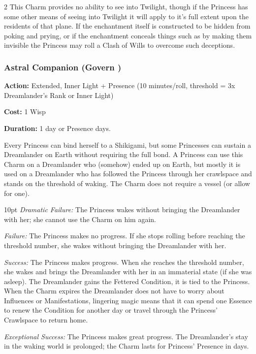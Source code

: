 \begin{multicols}{2}
This Charm provides no ability to see into Twilight, though if the Princess has some other means of seeing into Twilight it will apply to it's full extent upon the residents of that plane. If the enchantment itself is constructed to be hidden from poking and prying, or if the enchantment conceals things such as by making them invisible the Princess may roll a Clash of Wills to overcome such deceptions. 

\subsubsection*{Astral Companion (Govern \textbullet\textbullet\textbullet)}

\noindent \textbf{Action:} Extended, Inner Light + Presence (10 minutes/roll, threshold = 3x Dreamlander's Rank or Inner Light)

\noindent \textbf{Cost:} 1 Wisp

\noindent \textbf{Duration:} 1 day or Presence days.

Every Princess can bind herself to a Shikigami, but some Princesses can sustain a Dreamlander on Earth without requiring the full bond. A Princess can use this Charm on a Dreamlander who (somehow) ended up on Earth, but mostly it is used on a Dreamlander who has followed the Princess through her crawlspace and stands on the threshold of waking. The Charm does not require a vessel (or allow for one).

\begin{myindentpar}{10pt}    \emph{Dramatic Failure:} The Princess wakes without bringing the Dreamlander with her; she cannot use the Charm on him again.

    \emph{Failure:} The Princess makes no progress. If she stops rolling before reaching the threshold number, she wakes without bringing the Dreamlander with her.

    \emph{Success:} The Princess makes progress. When she reaches the threshold number, she wakes and brings the Dreamlander with her in an immaterial state (if she was asleep). The Dreamlander gains the Fettered Condition, it is tied to the Princess. When the Charm expires the Dreamlander does not have to worry about Influences or Manifestations, lingering magic means that it can spend one Essence to renew the Condition for another day or travel through the Princess' Crawlspace to return home. 

    \emph{Exceptional Success:} The Princess makes great progress. The Dreamlander's stay in the waking world is prolonged; the Charm lasts for Princess' Presence in days.\end{myindentpar}


\end{multicols}
